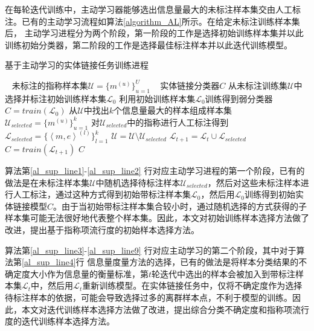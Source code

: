 在每轮迭代训练中，主动学习器能够选出信息量最大的未标注样本集交由人工标注。已有的主动学习\cite{settles2012active}流程如算法\ref{algorithm_AL}所示。在给定未标注训练样本集后， 主动学习进程分为两个阶段，第一阶段的工作是选择初始训练样本集并以此训练初始分类器，第二阶段的工作是选择最佳标注样本并以此迭代训练模型。

\renewcommand{\algorithmicrequire}{\textbf{输入:}} %
\renewcommand{\algorithmicensure}{\textbf{输出:}} %
\begin{algorithm}[!htb]
	\caption{基于主动学习的实体链接任务训练进程}
	\label{algorithm_AL}
	\begin{algorithmic}[1] %
		\REQUIRE ~ %
		未标注的指称样本集$ \mathcal{U}=\{m^{(u)} \}_{u=1}^U $
		\ENSURE ~ %
		实体链接分类器$C$
		\STATE 从未标注训练集$\mathcal{U}$中选择并标注初始训练样本集$\mathcal{L}_0$\label{al_sup_line1}
		\STATE 利用初始训练样本集$\mathcal{L}_{0}$训练得到弱分类器$C=train(\mathcal{L}_{0})$\label{al_sup_line2}
		\REPEAT \label{al_sup_line3}
		\STATE 从$\mathcal{U}$中找出$k$个信息量最大的样本组成样本集$ \mathcal{U}_{selected} = \{m^{(u)} \}_{u=1}^{k} $\label{al_sup_line4}
		\STATE 对$ \mathcal{U}_{selected}$中的指称进行人工标注得到$ \mathcal{L}_{selected} = \{\left\langle m,e\right\rangle^{(l)} \}_{l=1}^{k} $
		\STATE $ \mathcal{U} = \mathcal{U} \setminus \mathcal{U}_{selected} $
		\STATE $ \mathcal{L}_{t+1} = \mathcal{L}_{t} \cup \mathcal{L}_{selected} $
		\STATE $C=train(\mathcal{L}_{t+1})$
		 \label{al_sup_line9}
		\RETURN $C$
	\end{algorithmic}
\end{algorithm}

算法第\ref{al_sup_line1}-\ref{al_sup_line2} 行对应主动学习进程的第一个阶段，已有的做法是在未标注样本集$\mathcal{U}$中随机选择待标注样本$\mathcal{U}_{selected}$，然后对这些未标注样本进行人工标注，通过这种方式得到初始带标注样本集$\mathcal{L}_0$，然后用$\mathcal{L}_0$训练得到初始实体链接模型$C$。由于当初始带标注样本集合较小时，通过随机选择的方式获得的子样本集可能无法很好地代表整个样本集。因此，本文对初始训练样本选择方法做了改进，提出基于指称项流行度的初始样本选择方法。

算法第\ref{al_sup_line3}-\ref{al_sup_line9} 行对应主动学习的第二个阶段，其中对于算法第\ref{al_sup_line4}行 信息量度量方法的选择，已有的做法是将样本分类结果的不确定度大小作为信息量的衡量标准，第$t$轮迭代中选出的样本会被加入到带标注样本集$\mathcal{L}_t$中，然后用$\mathcal{L}_t$重新训练模型。在实体链接任务中，仅将不确定度作为选择待标注样本的依据，可能会导致选择过多的离群样本点，不利于模型的训练。因此，本文对迭代训练样本选择方法做了改进，提出综合分类不确定度和指称项流行度的迭代训练样本选择方法。

